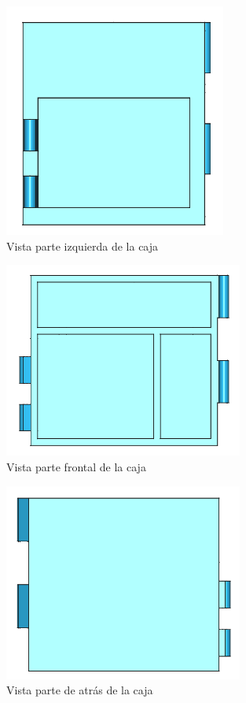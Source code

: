 \begin{figure}[H]
	\centering
	\includegraphics[width=0.65\textwidth]{images/4-DesarrolloTeorico/4-1-caja/CAJA_3D_IZQ.png}
	\caption{Vista parte izquierda de la caja}
\end{figure}

\begin{figure}[H]
	\centering
	\includegraphics[width=0.7\textwidth]{images/4-DesarrolloTeorico/4-1-caja/CAJA_3D_FRONTAL.png}
	\caption{Vista parte frontal de la caja}
\end{figure}

\begin{figure}[H]
	\centering
	\includegraphics[width=0.7\textwidth]{images/4-DesarrolloTeorico/4-1-caja/CAJA_3D_ATRAS.png}
	\caption{Vista parte de atrás de la caja}
\end{figure}